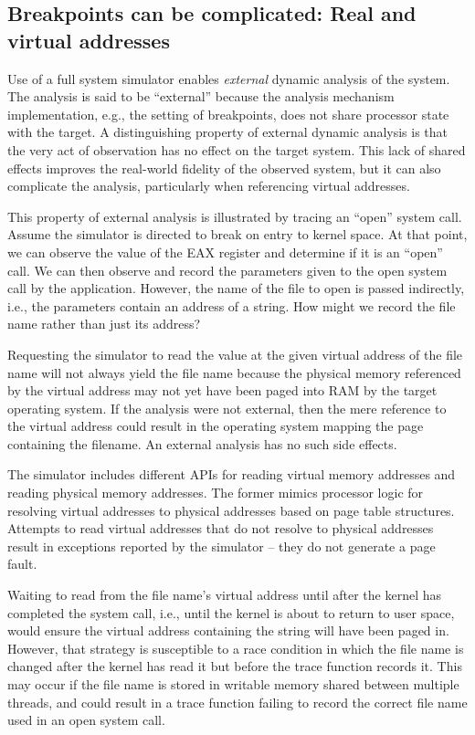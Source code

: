 \documentclass[titlepage]{article}
\begin{document}
\begin{appendices}
\section{Breakpoints can be complicated: Real and virtual addresses}
\label{external}
Use of a full system simulator enables \textit{external} dynamic analysis of the system.  The analysis is said to be
“external” because the analysis mechanism implementation, e.g., the setting of breakpoints,  does not 
share processor state with the target.
A distinguishing property of external dynamic analysis is that the very act of observation has no effect on the target
system.  This lack of shared effects improves the real-world fidelity of the observed system, but it can also complicate the
analysis, particularly when referencing virtual addresses. 

This property of external analysis is illustrated by tracing an “open” system call. 
Assume the simulator is directed to break on entry to kernel space.  At that point, we can observe the value
of the EAX register and determine if it is an “open” call.  We can then observe and record the
parameters given to the open system call by the application.  However, the name of the file to open
is passed indirectly, i.e., the parameters contain an address of a string.  How might we record
the file name rather than just its address?   

Requesting the simulator to read the value at the given virtual address of the
file name will not always yield the file name because the
physical memory referenced by the virtual address may not yet have been paged into RAM by the target operating system.
If the analysis were not external, then the mere reference to the virtual address could result in the
operating system mapping the page containing the filename.  An external analysis has no such side effects.

The simulator includes different APIs for reading virtual memory addresses and reading physical memory addresses.
The former mimics processor logic for resolving virtual addresses to physical addresses based on page table
structures. Attempts to read virtual addresses that do not resolve to physical addresses result in exceptions reported
by the simulator -- they do not generate a page fault.

Waiting to read from the file name's virtual address until after the kernel has completed the system call, i.e.,
until the kernel is about to return to user space, would ensure the virtual address containing the string
will have been paged in.  However, that strategy is susceptible to a race condition in which the file
name is changed after the kernel has read it but before the trace function records it.  This may occur
if the file name is stored in writable memory shared between multiple threads, and could result in a trace function
failing to record the correct file name used in an open system call.
 

\end{appendices}
\end{document}
